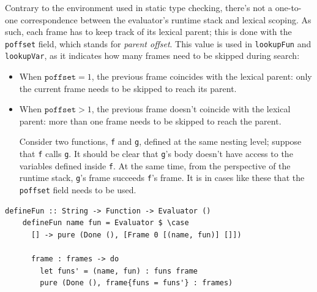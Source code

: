 \documentclass[UdineBachThesis,american,11pt]{PhdThesis}
\begin{document}
  Contrary to the environment used in static type checking, there's not a
  one-to-one correspondence between the evaluator's runtime stack and lexical
  scoping. As such, each frame has to keep track of its lexical parent; this is
  done with the \mbox{\texttt{poffset}} field, which stands for \emph{parent
  offset}. This value is used in \mbox{\texttt{lookupFun}} and
  \mbox{\texttt{lookupVar}}, as it indicates how many frames need to be skipped
  during search:

  \begin{itemize}
    \item When \mbox{$\texttt{poffset} = 1$}, the previous frame coincides with
    the lexical parent: only the current frame needs to be skipped to reach its
    parent.

    \item When \mbox{$\texttt{poffset} > 1$}, the previous frame doesn't
    coincide with the lexical parent: more than one frame needs to be skipped to
    reach the parent.

    Consider two functions, \texttt{f} and \texttt{g}, defined at the same
    nesting level; suppose that \texttt{f} calls \texttt{g}. It should be clear
    that \texttt{g}'s body doesn't have access to the variables defined inside
    \texttt{f}. At the same time, from the perspective of the runtime stack,
    \texttt{g}'s frame succeeds \texttt{f}'s frame. It is in cases like these
    that the \mbox{\texttt{poffset}} field needs to be used.
  \end{itemize}

  \begin{Verbatim}[gobble=4,fontsize=\small]
    defineFun :: String -> Function -> Evaluator ()
    defineFun name fun = Evaluator $ \case
      [] -> pure (Done (), [Frame 0 [(name, fun)] []])

      frame : frames -> do
        let funs' = (name, fun) : funs frame
        pure (Done (), frame{funs = funs'} : frames)
  \end{Verbatim}

  \pagebreak
\end{document}
